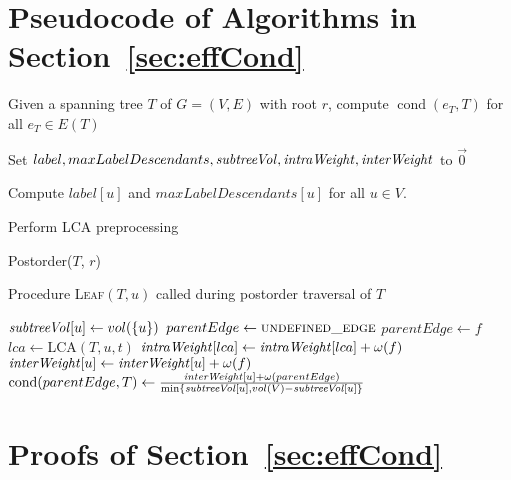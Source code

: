 \documentclass[pdftex]{llncs}
\newcommand{\cond}{\operatorname{cond}}
\DeclareMathOperator{\intraWeight}{\it intraWeight}
\DeclareMathOperator{\interWeight}{\it interWeight}
\DeclareMathOperator{\subtreeVol}{\it subtreeVol}
\numberwithin{equation}{section}
\numberwithin{example}{section}
\numberwithin{table}{section}
\begin{document}
\begin{footnotesize}


\end{footnotesize}


\newpage
\appendix
\section{Pseudocode of Algorithms in Section~\ref{sec:effCond}}
\label{sec:pseudocode}
\begin{algorithm}[!h]
\caption{Given a spanning tree $T$ of $G=(V, E)$ with root $r$,
  compute $\cond(e_T, T)$ for all $e_T \in E(T)$}
\label{algo:BTE}
\begin{algorithmic}[1]
\State Set $label, maxLabelDescendants, \subtreeVol, \intraWeight, \interWeight$ to $\vec{0}$

\State Compute $label[u]$ and $maxLabelDescendants[u]$ for all $u \in V$.

\State Perform LCA preprocessing

\State Postorder($T$, $r$)
\end{algorithmic}
\end{algorithm}


\begin{algorithm}[h!]
\caption{Procedure \textsc{Leaf}$(T, u)$ called during postorder traversal of $T$}
\label{algo:Leaf}
\begin{algorithmic}[1]
\State $\subtreeVol[u] \gets vol({\{u\}})$
\State $parentEdge \gets \textsc{undefined\_edge}$
    \State $parentEdge \gets f$
  \Else
    \State $lca \gets $\textsc{LCA}$(T, u, t)$
    \State $\intraWeight[lca] \gets \intraWeight[lca] + \omega(f)$
    \State $\interWeight[u] \gets \interWeight[u] + \omega(f)$
  \EndIf
\EndFor
{} \State
$\cond(parentEdge, T) \gets \frac{\interWeight[u] +
  \omega(parentEdge)}{\min\{\subtreeVol[u], vol(V) - \subtreeVol[u]\}} $
\EndIf
\end{algorithmic}
\end{algorithm}

\section{Proofs of Section~\ref{sec:effCond}}
\label{sec:proofs-apx}
\end{document}
